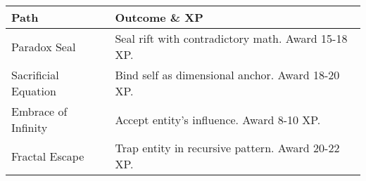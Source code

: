\documentclass[11pt]{article}
\begin{document}
\begin{tabular}{|p{4cm}|p{8cm}|}
\hline
\textbf{Path} & \textbf{Outcome \& XP} \\
\hline
Paradox Seal & Seal rift with contradictory math. Award 15-18 XP. \\
Sacrificial Equation & Bind self as dimensional anchor. Award 18-20 XP. \\
Embrace of Infinity & Accept entity's influence. Award 8-10 XP. \\
Fractal Escape & Trap entity in recursive pattern. Award 20-22 XP. \\
\hline
\end{tabular}
\end{document}

